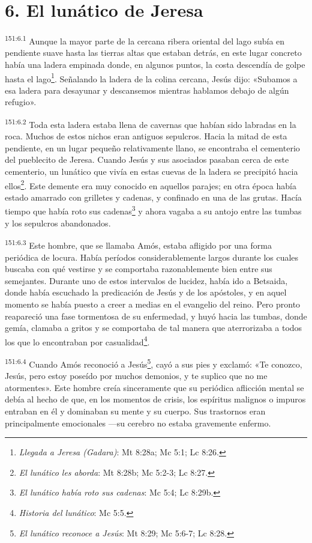 \section*{6. El lunático de Jeresa}
\par
\textsuperscript{151:6.1} Aunque la mayor parte de la cercana ribera oriental del lago subía en pendiente suave hasta las tierras altas que estaban detrás, en este lugar concreto había una ladera empinada donde, en algunos puntos, la costa descendía de golpe hasta el lago\footnote{\textit{Llegada a Jeresa (Gadara)}: Mt 8:28a; Mc 5:1; Lc 8:26.}. Señalando la ladera de la colina cercana, Jesús dijo: «Subamos a esa ladera para desayunar y descansemos mientras hablamos debajo de algún refugio».

\par
\textsuperscript{151:6.2} Toda esta ladera estaba llena de cavernas que habían sido labradas en la roca. Muchos de estos nichos eran antiguos sepulcros. Hacia la mitad de esta pendiente, en un lugar pequeño relativamente llano, se encontraba el cementerio del pueblecito de Jeresa. Cuando Jesús y sus asociados pasaban cerca de este cementerio, un lunático que vivía en estas cuevas de la ladera se precipitó hacia ellos\footnote{\textit{El lunático les aborda}: Mt 8:28b; Mc 5:2-3; Lc 8:27.}. Este demente era muy conocido en aquellos parajes; en otra época había estado amarrado con grilletes y cadenas, y confinado en una de las grutas. Hacía tiempo que había roto sus cadenas\footnote{\textit{El lunático había roto sus cadenas}: Mc 5:4; Lc 8:29b.} y ahora vagaba a su antojo entre las tumbas y los sepulcros abandonados.

\par
\textsuperscript{151:6.3} Este hombre, que se llamaba Amós, estaba afligido por una forma periódica de locura. Había períodos considerablemente largos durante los cuales buscaba con qué vestirse y se comportaba razonablemente bien entre sus semejantes. Durante uno de estos intervalos de lucidez, había ido a Betsaida, donde había escuchado la predicación de Jesús y de los apóstoles, y en aquel momento se había puesto a creer a medias en el evangelio del reino. Pero pronto reapareció una fase tormentosa de su enfermedad, y huyó hacia las tumbas, donde gemía, clamaba a gritos y se comportaba de tal manera que aterrorizaba a todos los que lo encontraban por casualidad\footnote{\textit{Historia del lunático}: Mc 5:5.}.

\par
\textsuperscript{151:6.4} Cuando Amós reconoció a Jesús\footnote{\textit{El lunático reconoce a Jesús}: Mt 8:29; Mc 5:6-7; Lc 8:28.}, cayó a sus pies y exclamó: «Te conozco, Jesús, pero estoy poseído por muchos demonios, y te suplico que no me atormentes». Este hombre creía sinceramente que su periódica aflicción mental se debía al hecho de que, en los momentos de crisis, los espíritus malignos o impuros entraban en él y dominaban su mente y su cuerpo. Sus trastornos eran principalmente emocionales ---su cerebro no estaba gravemente enfermo.

